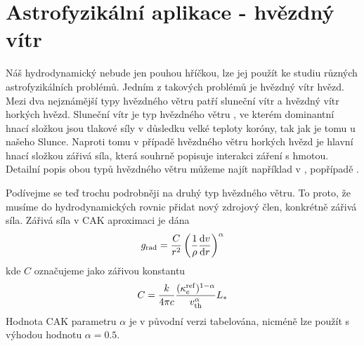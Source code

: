 \section{Astrofyzikální aplikace - hvězdný vítr}
Náš hydrodynamický nebude jen pouhou hříčkou, lze jej použít ke studiu různých astrofyzikálních problémů. Jedním z takových problémů je hvězdný vítr hvězd. Mezi dva nejznámější typy hvězdného větru patří sluneční vítr a hvězdný vítr horkých hvězd. Sluneční vítr je typ hvězdného větru , ve kterém dominantní hnací složkou jsou tlakové síly v důsledku velké teploty koróny, tak jak je tomu u našeho Slunce. Naproti tomu v případě hvězdného větru horkých hvězd je hlavní hnací složkou zářivá síla, která souhrně popisuje interakci záření s hmotou. Detailní popis obou typů hvězdného větru můžeme najít například v \citep{Lamers}, popřípadě \citep{Thompson}. 

Podívejme se teď trochu podrobněji na druhý typ hvězdného větru. To proto, že musíme do hydrodynamických rovnic přidat nový zdrojový člen, konkrétně zářivá síla. Zářivá síla v CAK aproximaci je dána
\begin{equation}
\label{equation:CAK}
g_{\rm rad}= \frac{C}{r^2}\left(\frac{1}{\rho}\frac{{\rm d}v}{{\rm d}r}\right)^{\alpha}
\end{equation}  
kde $C$ označujeme jako zářivou konstantu
\begin{equation}
\label{equation:cak_constant}
C =\frac{k}{4\pi c}\frac{(\kappa_e^{\rm ref})^{1-\alpha}}{v_{\rm th}^{\alpha}}L_{*}
\end{equation} 
Hodnota CAK parametru $\alpha$ je v původní verzi \citep{A1980,} tabelována, nicméně lze použít s výhodou hodnotu $\alpha = 0.5$. 

